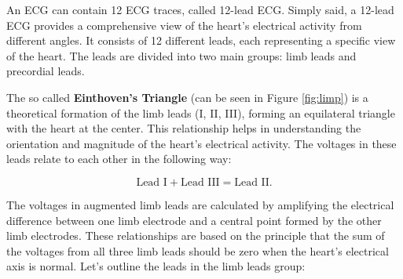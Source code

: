 \documentclass{mldsmsc}
\begin{document}
\noindent An ECG can contain 12 ECG traces, called 12-lead ECG. Simply said, a 12-lead ECG provides a comprehensive view of the heart's electrical activity from different angles. It consists of 12 different leads, each representing a specific view of the heart. The leads are divided into two main groups: limb leads and precordial leads. \newline

\noindent The so called  \textbf{Einthoven's Triangle} (can be seen in Figure \ref{fig:limp}) is a theoretical formation of the limb leads (I, II, III), forming an equilateral triangle with the heart at the center. This relationship helps in understanding the orientation and magnitude of the heart's electrical activity. The voltages in these leads relate to each other in the following way:

\begin{equation}
    \text{Lead I} + \text{Lead III} = \text{Lead II}.
\end{equation}

\noindent The voltages in augmented limb leads are calculated by amplifying the electrical difference between one limb electrode and a central point formed by the other limb electrodes. These relationships are based on the principle that the sum of the voltages from all three limb leads should be zero when the heart's electrical axis is normal. Let's outline the leads in the limb leads group: \newline
\end{document}
